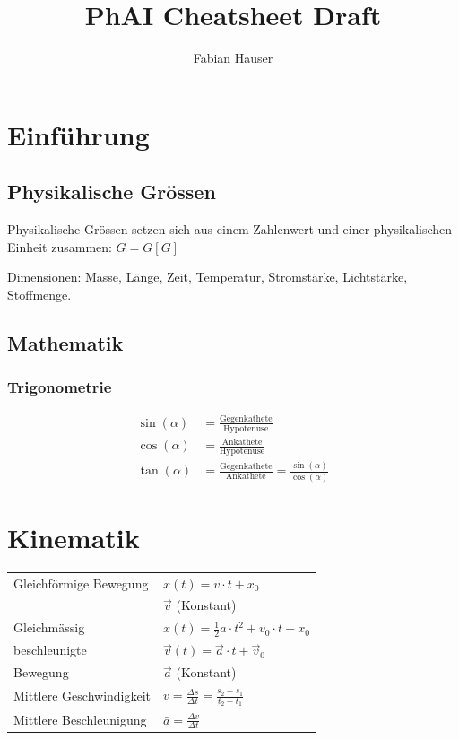 \documentclass[a4paper]{scrartcl}
\title{PhAI Cheatsheet Draft}
\author{Fabian Hauser}
\begin{document}
\maketitle


\section{Einführung}

\subsection{Physikalische Grössen}

Physikalische Grössen setzen sich aus einem Zahlenwert und einer physikalischen Einheit
zusammen: $G = {G}[G]$

Dimensionen: Masse, Länge, Zeit, Temperatur, Stromstärke, Lichtstärke,
Stoffmenge.

\subsection{Mathematik}
\subsubsection{Trigonometrie}
	\begin{align*}
		\sin(\alpha) &= \frac{\text{Gegenkathete}}{\text{Hypotenuse}} \\
		\cos(\alpha) &= \frac{\text{Ankathete}}{\text{Hypotenuse}} \\
		\tan(\alpha) &=  \frac{\text{Gegenkathete}}{\text{Ankathete}} = \frac{\sin(\alpha)}{\cos(\alpha)}
	\end{align*}

\section{Kinematik}
	\begin{tabu} {l X}
		\hline
		Gleichförmige Bewegung
		&	$x(t) = v \cdot t + x_0$
		\\
		&	$\vec{v}$ (Konstant)
		\\ \hline
		Gleichmässig
		&	$x(t) = \frac{1}{2} a \cdot t^2 + v_0 \cdot t + x_0$
		\\
		beschleunigte
		&	$\vec{v}(t) = \vec{a} \cdot t + \vec{v}_0$
		\\
		Bewegung
		&	$\vec{a}$ (Konstant)
		\\ \hline
		Mittlere Geschwindigkeit
		&	$\bar{v} = \frac{\Delta s}{\Delta t} = \frac{s_2 - s_1}{t_2 - t_1}$
		\\ \hline
		Mittlere Beschleunigung
		&	$\bar{a} = \frac{\Delta v}{\Delta t}$ 
		\\ \hline
	\end{tabu}
\end{document}
